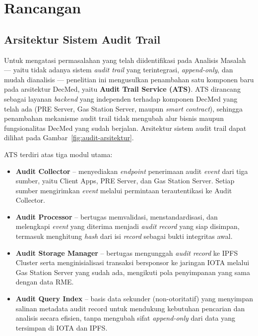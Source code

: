 
% 

% 

\section{Rancangan}

\subsection{Arsitektur Sistem Audit Trail}

Untuk mengatasi permasalahan yang telah diidentifikasi pada Analisis Masalah
--- yaitu tidak adanya sistem \textit{audit trail} yang terintegrasi, \textit{append-only},
dan mudah dianalisis --- penelitian ini mengusulkan penambahan satu komponen
baru pada arsitektur DecMed, yaitu \textbf{Audit Trail Service (ATS)}.
ATS dirancang sebagai layanan \textit{backend} yang independen terhadap
komponen DecMed yang telah ada (PRE Server, Gas Station Server, maupun
\textit{smart contract}), sehingga penambahan mekanisme audit trail tidak
mengubah alur bisnis maupun fungsionalitas DecMed yang sudah berjalan.
Arsitektur sistem audit trail dapat dilihat pada Gambar~\ref{fig:audit-arsitektur}.

ATS terdiri atas tiga modul utama:
\begin{itemize}
    \item \textbf{Audit Collector} -- menyediakan \textit{endpoint} penerimaan
    audit \textit{event} dari tiga sumber, yaitu Client Apps, PRE Server, dan
    Gas Station Server. Setiap sumber mengirimkan \textit{event} melalui
    permintaan terautentikasi ke Audit Collector.
    \item \textbf{Audit Processor} -- bertugas memvalidasi, menstandardisasi,
    dan melengkapi \textit{event} yang diterima menjadi \textit{audit record}
    yang siap disimpan, termasuk menghitung \textit{hash} dari isi \textit{record}
    sebagai bukti integritas awal.
    \item \textbf{Audit Storage Manager} -- bertugas mengunggah \textit{audit
    record} ke IPFS Cluster serta menginisialisasi transaksi bersponsor ke
    jaringan IOTA melalui Gas Station Server yang sudah ada, mengikuti pola
    penyimpanan yang sama dengan data RME.
    \item \textbf{Audit Query Index} -- basis data sekunder (non-otoritatif)
    yang menyimpan salinan metadata audit record untuk mendukung kebutuhan
    pencarian dan analisis secara efisien, tanpa mengubah sifat \textit{append-only}
    dari data yang tersimpan di IOTA dan IPFS.
\end{itemize}

